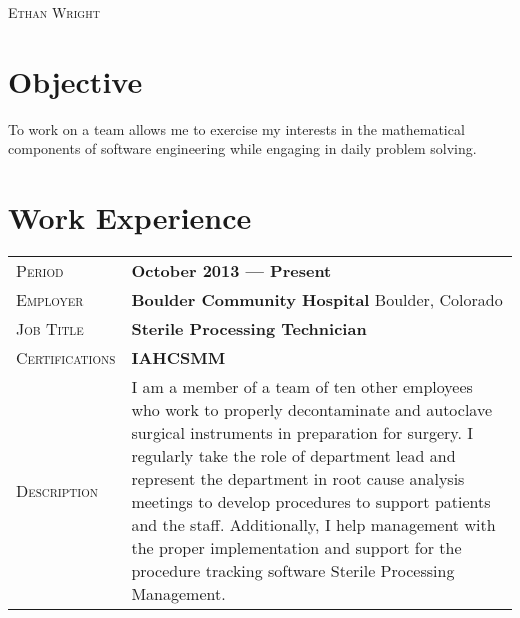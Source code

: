 \documentclass[a4paper, oneside, final]{scrartcl} %
\newcommand{\gray}{\rowcolor[gray]{.90}} %
\begin{document}
\begin{center} %


{\fontsize{36}{36}\selectfont\scshape Ethan Wright} %

\vspace{0.5cm} %


  \section{Objective}
\begin{flushleft}
  To work on a team allows me to exercise my interests in the mathematical components of software engineering 
      while engaging in daily problem solving.
\end{flushleft}

    \section{Work Experience}

    \begin{tabularx}{0.97\linewidth}{>{\raggedleft\scshape}p{3cm}X}
    \gray Period & \textbf{October 2013 --- Present}\\
    \gray Employer & \textbf{Boulder Community Hospital} \hfill Boulder, Colorado\\
    \gray Job Title & \textbf{Sterile Processing Technician}\\
    \gray Certifications & \textbf{IAHCSMM}\\
    Description & I am a member of a team of ten other employees who work to properly decontaminate and autoclave surgical instruments in preparation for surgery. I regularly take the role of department lead and represent the department in root cause analysis meetings to develop procedures to support patients and the staff. Additionally, I help management with the proper implementation and support for the procedure tracking software Sterile Processing Management.     \end{tabularx}


\end{center}
\end{document}
